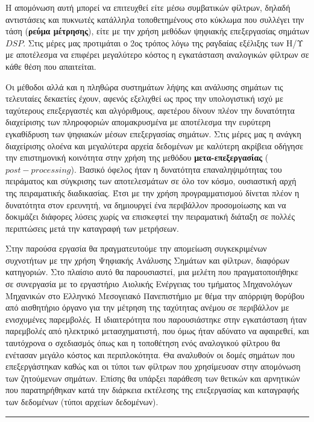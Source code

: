 \documentclass[breaklines=true, 12pt]{article}
\begin{document}
Η απομόνωση αυτή μπορεί να επιτευχθεί είτε μέσω συμβατικών φίλτρων,
δηλαδή αντιστάσεις και πυκνωτές κατάλληλα τοποθετημένους στο κύκλωμα που
συλλέγει την τάση (\textbf{ρεύμα μέτρησης}), είτε με την χρήση μεθόδων ψηφιακής
επεξεργασίας σημάτων \(DSP\).
Στις μέρες μας προτιμάται ο 2ος τρόπος λόγω
της ραγδαίας εξέλιξης των Η/Υ με αποτέλεσμα να επιφέρει μεγαλύτερο
κόστος η εγκατάσταση αναλογικών φίλτρων σε κάθε θέση που απαιτείται.

Οι μέθοδοι αλλά και η πληθώρα συστημάτων λήψης και ανάλυσης σημάτων τις
τελευταίες δεκαετίες έχουν, αφενός εξελιχθεί ως προς την υπολογιστική
ισχύ με ταχύτερους επεξεργαστές και αλγόριθμους, αφετέρου δίνουν
πλέον την δυνατότητα διαχείρισης των πληροφοριών απομακρυσμένα με
αποτέλεσμα την ευρύτερη εγκαθίδρυση των ψηφιακών μέσων επεξεργασίας
σημάτων. Στις μέρες μας η ανάγκη διαχείρισης ολοένα και μεγαλύτερα
αρχεία δεδομένων με καλύτερη ακρίβεια οδήγησε την επιστημονική κοινότητα
στην χρήση της μεθόδου \textbf{μετα-επεξεργασίας} (\(post-processing\)). Βασικό όφελος
ήταν η δυνατότητα επαναληψιμότητας του πειράματος και σύγκρισης των
αποτελεσμάτων σε όλο τον κόσμο, ουσιαστική αρχή της πειραματικής
διαδικασίας. Έτσι με την χρήση προγραμματισμού δίνεται πλέον η
δυνατότητα στον ερευνητή, να δημιουργεί ένα περιβάλλον προσομοίωσης και
να δοκιμάζει διάφορες λύσεις χωρίς να επισκεφτεί την πειραματική διάταξη
σε πολλές περιπτώσεις μετά την καταγραφή των μετρήσεων.

Στην παρούσα εργασία θα πραγματευτούμε την απομείωση συγκεκριμένων
συχνοτήτων με την χρήση Ψηφιακής Ανάλυσης Σημάτων και φίλτρων, διαφόρων
κατηγοριών. Στο πλαίσιο αυτό θα παρουσιαστεί, μια μελέτη που
πραγματοποιήθηκε σε συνεργασία με το εργαστήριο Αιολικής Ενέργειας του
τμήματος Μηχανολόγων Μηχανικών στο Ελληνικό Μεσογειακό Πανεπιστήμιο με
θέμα την απόρριψη θορύβου από αισθητήριο όργανο για την μέτρηση της
ταχύτητας ανέμου σε περιβάλλον με ενισχυμένες παρεμβολές. Η
ιδιαιτερότητα που παρουσιάστηκε στην εγκατάσταση ήταν παρεμβολές από
ηλεκτρικό μετασχηματιστή, που όμως ήταν αδύνατο να
αφαιρεθεί, και ταυτόχρονα ο σχεδιασμός όπως και η τοποθέτηση ενός
αναλογικού φίλτρου θα ενέτασαν μεγάλο κόστος και περιπλοκότητα. Θα
αναλυθούν οι δομές σημάτων που επεξεργάστηκαν καθώς και οι τύποι των
φίλτρων που χρησίμευσαν στην απομόνωση των ζητούμενων σημάτων. Επίσης θα
υπάρξει παράθεση των θετικών και αρνητικών που παρατηρήθηκαν κατά την
διάρκεια εκτέλεσης της επεξεργασίας και καταγραφής των δεδομένων (τύποι
αρχείων δεδομένων).

\noindent\rule{\textwidth}{0.5pt}
\end{document}
